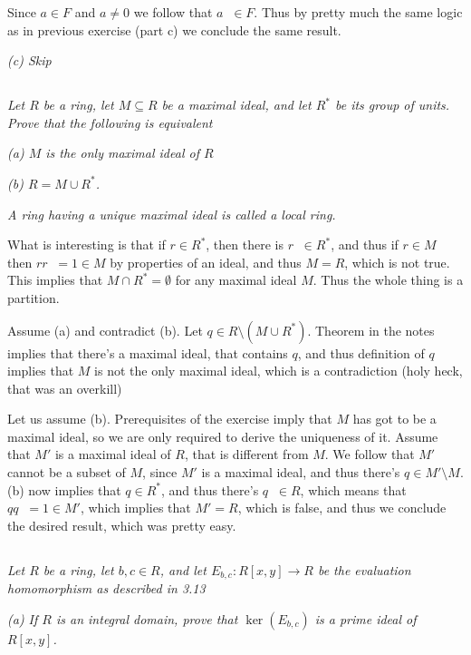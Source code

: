 \documentclass[11pt,oneside,titlepage]{book}
\DeclareMathOperator \inv {^{-1}}
\begin{document}
Since $a \in F$ and $a \neq 0$ we follow that $a \inv \in F$. Thus by
pretty much the same logic as in previous exercise (part c) we
conclude the same result.

\textit{(c) Skip}

\subsection{}

\textit{Let $R$ be a ring, let $M \subseteq R$ be a maximal ideal, and
let $R^*$ be its group of units. Prove that the following is
equivalent}

\textit{(a) $M$ is the only maximal ideal of $R$}

\textit{(b) $R = M \cup R^*$.}

\textit{A ring having a unique maximal ideal is called a local ring.}

What is interesting is that if $r \in R^*$, then there is $r\inv \in
R^*$, and thus if $r \in M$ then $r r\inv = 1 \in M$ by properties of
an ideal, and thus $M = R$, which is not true. This implies that $M
\cap R^* = \emptyset$ for any maximal ideal $M$. Thus the whole thing
is a partition.

Assume (a) and contradict (b). Let $q \in R \setminus (M \cup
R^*)$. Theorem in the notes implies that there's a maximal ideal,
that contains $q$, and thus definition of $q$ implies that $M$ is
not the only maximal ideal, which is a contradiction (holy heck,
that was an overkill)

Let us assume (b). Prerequisites of the exercise imply that $M$ has
got to be a maximal ideal, so we are only required to derive the
uniqueness of it. Assume that $M'$ is a maximal ideal of $R$,
that is different from $M$. We follow that $M'$ cannot
be a subset of $M$, since $M'$ is a maximal ideal, and thus
there's $q \in M' \setminus M$. (b) now implies that $q \in R^*$,
and thus there's $q\inv \in R$, which means that $q q\inv = 1 \in M'$,
which implies that $M' = R$, which is false, and thus we conclude the
desired result, which was pretty easy.

\subsection{}

\textit{Let $R$ be a ring, let $b, c \in R$, and let $E_{b, c}: R[x,
  y] \to R$ be the evaluation homomorphism as described in 3.13 }

\textit{(a) If $R$ is an integral domain, prove that $\ker(E_{b,c})$
  is a prime ideal of $R[x, y]$.}
\end{document}

